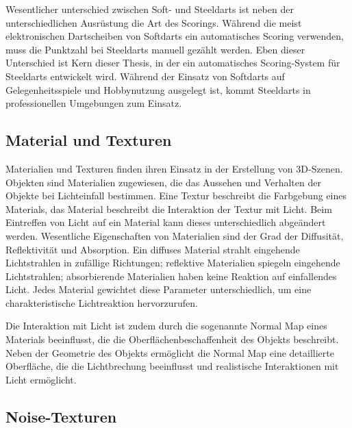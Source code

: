 Wesentlicher unterschied zwischen Soft- und Steeldarts ist neben der unterschiedlichen Ausrüstung die Art des Scorings. Während die meist elektronischen Dartscheiben von Softdarts ein automatisches Scoring verwenden, muss die Punktzahl bei Steeldarts manuell gezählt werden. Eben dieser Unterschied ist Kern dieser Thesis, in der ein automatisches Scoring-System für Steeldarts entwickelt wird. Während der Einsatz von Softdarts auf Gelegenheitsspiele und Hobbynutzung ausgelegt ist, kommt Steeldarts in professionellen Umgebungen zum Einsatz.


\subsection{Material und Texturen}  %
\label{sec:material_texturen}

Materialien und Texturen finden ihren Einsatz in der Erstellung von 3D-Szenen. Objekten sind Materialien zugewiesen, die das Aussehen und Verhalten der Objekte bei Lichteinfall bestimmen. Eine Textur beschreibt die Farbgebung eines Materials, das Material beschreibt die Interaktion der Textur mit Licht. Beim Eintreffen von Licht auf ein Material kann dieses unterschiedlich abgeändert werden. Wesentliche Eigenschaften von Materialien sind der Grad der Diffusität, Reflektivität und Absorption. Ein diffuses Material strahlt eingehende Lichtstrahlen in zufällige Richtungen; reflektive Materialien spiegeln eingehende Lichtstrahlen; absorbierende Materialien haben keine Reaktion auf einfallendes Licht. Jedes Material gewichtet diese Parameter unterschiedlich, um eine charakteristische Lichtreaktion hervorzurufen.

Die Interaktion mit Licht ist zudem durch die sogenannte Normal Map eines Materials beeinflusst, die die Oberflächenbeschaffenheit des Objekts beschreibt. Neben der Geometrie des Objekts ermöglicht die Normal Map eine detaillierte Oberfläche, die die Lichtbrechung beeinflusst und realistische Interaktionen mit Licht ermöglicht.


\subsection{Noise-Texturen}
\label{sec:noise}


